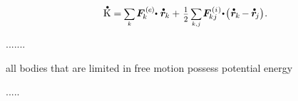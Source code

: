\nopagebreak\vspace{-0.3em}
\begin{equation}\label{thebalanceofkineticenergy.finally}
\mathdotabove{\kineticenergyinmechanics} \hspace{.1ex}
= \hspace{-0.1ex}
\scalebox{.8}{$ \displaystyle \sum_{\smash{k}} $} \hspace{.3ex}
\bm{F}^{\smthexternal}_{\hspace{-0.16ex}k} \hspace{-0.4ex} \dotp \hspace{.1ex} \mathdotabove{\locationvector}_{\hspace{-0.1ex}k}
+ \hspace{.2ex}
\smalldisplaystyleonehalf \hspace{.3ex} \scalebox{.8}{$ \displaystyle \sum_{\smash{k,\hspace{.1ex}j}} $}
\hspace{.2ex} \bm{F}^{\smthinternal}_{\hspace{-0.16ex}kj} \hspace{-0.3ex} \dotp \hspace{-0.3ex}
\bigl( \hspace{.1ex} \mathdotabove{\locationvector}_{\hspace{-0.1ex}k}
\hspace{-0.2ex} - \hspace{-0.1ex}
\mathdotabove{\locationvector}_{\hspace{-0.2ex}j} \bigr)
\hspace{.1ex} .
\end{equation}

.......

all bodies that are limited in free motion possess potential energy

.....

